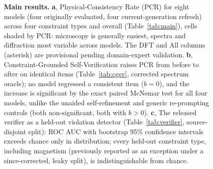 \documentclass[pdflatex,sn-nature]{sn-jnl}
\begin{document}
\begin{figure}[t]
{\begin{tikzpicture}[font=\sffamily]
\end{tikzpicture}}
\caption{\textbf{Main results.} \textbf{a}, Physical-Consistency Rate (PCR) for eight
models (four originally evaluated, four current-generation refresh) across four constraint types and overall (Table~\ref{tab:main}), cells shaded by
PCR: microscopy is generally easiest, spectra and diffraction most variable across
models. The
DFT and All columns (asterisk) are provisional pending domain-expert validation.
\textbf{b}, Constraint-Grounded Self-Verification raises PCR from before to after on
identical items (Table~\ref{tab:cgsv}, corrected spectrum oracle); no model regressed a consistent item ($b=0$), and
the increase is significant by the exact paired McNemar test for all four models, unlike
the unaided self-refinement and generic re-prompting controls (both non-significant, both
with $b>0$). \textbf{c}, The released verifier as a
held-out violation detector (Table~\ref{tab:verifier}, source-disjoint split): ROC AUC with bootstrap 95\%
confidence intervals exceeds chance only in distribution; every held-out constraint type,
including magnetism (previously reported as an exception under a since-corrected, leaky
split), is indistinguishable from chance.}
\label{fig:results}
\end{figure}

\end{document}
